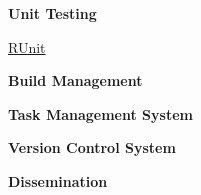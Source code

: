 \begin{frame}\textbf{\Large Unit Testing}\vspace{1cm}
\begin{center}
\href{http://runit.sourceforge.net/}{\Huge \textsf{R}Unit}
\end{center}
\end{frame}

\begin{frame}\textbf{\Large Build Management}\vspace{1cm}
\begin{center}
\end{center}
\end{frame}


\begin{frame}\textbf{\Large Task Management System}\vspace{1cm}
\begin{center}
\end{center}
\end{frame}


\begin{frame}\textbf{\Large Version Control System}\vspace{1cm}
\begin{center}
\end{center}
\end{frame}


\begin{frame}\textbf{\Large Dissemination}\vspace{1cm}
\begin{center}
\end{center}
\end{frame}
